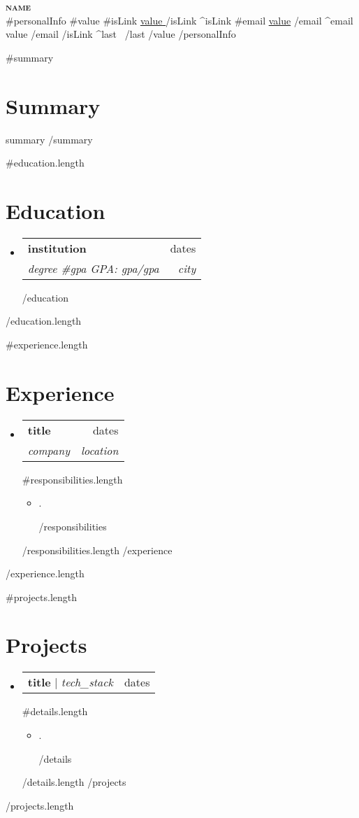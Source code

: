\documentclass[letterpaper,11pt]{article}
\newcommand{\resumeItem}[1]{
  \item\small{
    {#1 \vspace{-2pt}}
  }
}
\newcommand{\resumeSubheading}[4]{
  \vspace{-2pt}\item
    \begin{tabularx}{\textwidth}{Xr}
      \textbf{#1} & #2 \\
      \textit{\small#3} & \textit{\small #4} \\
    \end{tabularx}\vspace{-6pt}
}
\newcommand{\resumeProjectHeading}[2]{
    \item
    \begin{tabularx}{\textwidth}{Xr}
      \small #1 & #2 \\
    \end{tabularx}\vspace{-6pt}
}
\newcommand{\resumeSubHeadingListStart}{
  \begin{itemize}[leftmargin=0.15in, label={}, itemsep=3pt, parsep=0pt, topsep=0pt]
}
\newcommand{\resumeSubHeadingListEnd}{\end{itemize}}
\newcommand{\resumeItemListStart}{
  \begin{itemize}[itemsep=2pt, parsep=0pt, topsep=0pt]
}
\newcommand{\resumeItemListEnd}{\end{itemize}\vspace{-8pt}}
\begin{document}
\begin{center}
    \textbf{\Huge \scshape {{name}}} \\ \vspace{1pt}
    \small
    {{#personalInfo}}
      {{#value}}
        {{#isLink}}
          \href{ {{{link}}} }{ \underline{ {{value}} } }
        {{/isLink}}
        {{^isLink}}
          {{#email}}
            \underline{{{value}}}
          {{/email}}
          {{^email}}
            {{value}}
          {{/email}}
        {{/isLink}}
        {{^last}} \textbar\ {{/last}}
      {{/value}}
    {{/personalInfo}}
\end{center}

{{#summary}}
\section{Summary}
{{summary}}
{{/summary}}

{{#education.length}}
\section{Education}
\resumeSubHeadingListStart
  {{#education}}
    \resumeSubheading
      { {{institution}} }{ {{dates}} }
      { {{degree}} {{#gpa}} GPA: {{gpa}}{{/gpa}} }{ {{city}} }
  {{/education}}
\resumeSubHeadingListEnd
{{/education.length}}

{{#experience.length}}
\section{Experience}
\resumeSubHeadingListStart
  {{#experience}}
    \resumeSubheading
      { {{title}} }{ {{dates}} }
      { {{company}} }{ {{location}} }
      {{#responsibilities.length}}
      \resumeItemListStart
        {{#responsibilities}}
          \resumeItem{ {{.}} }
        {{/responsibilities}}
      \resumeItemListEnd
      {{/responsibilities.length}}
  {{/experience}}
\resumeSubHeadingListEnd
{{/experience.length}}

{{#projects.length}}
\section{Projects}
\resumeSubHeadingListStart
  {{#projects}}
    \resumeProjectHeading
      { \textbf{ {{title}} } $|$ \emph{ {{tech_stack}} } }{ {{dates}} }
      {{#details.length}}
      \resumeItemListStart
        {{#details}}
          \resumeItem{ {{.}} }
        {{/details}}
      \resumeItemListEnd
      {{/details.length}}
  {{/projects}}
\resumeSubHeadingListEnd
{{/projects.length}}
\end{document}
